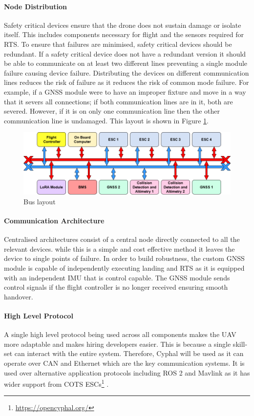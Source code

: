 \paragraph{Node Distribution}
Safety critical devices ensure that the drone does not sustain damage or isolate itself. This includes components necessary for flight and the sensors required for \gls{RTS}. To ensure that failures are minimised, safety critical devices should be redundant. If a safety critical device does not have a redundant version it should be able to communicate on at least two different lines preventing a single module failure causing device failure. Distributing the devices on different communication lines reduces the risk of failure as it reduces the risk of common mode failure. For example, if a \gls{GNSS} module were to have an improper fixture and move in a way that it severs all connections; if both communication lines are in it, both are severed. However, if it is on only one communication line then the other communication line is undamaged. This layout is shown in Figure \ref{fig:CAN_bus}. 
 \begin{figure}[h!]
 \centering
  \includegraphics[width=1\textwidth]{figs/Thomas/Intra Communication/CAN bus.png}
 \caption{Bus layout}
 \label{fig:CAN_bus}
 \end{figure}
\paragraph{Communication Architecture}
Centralised architectures consist of a central node directly connected to all the relevant devices. while this is a simple and cost effective method it leaves the device to single points of failure. In order to build robustness, the custom \gls{GNSS} module is capable of independently executing landing and \gls{RTS} as it is equipped with an independent \gls{IMU} that is control capable. The \gls{GNSS} module sends control signals if the flight controller is no longer received ensuring smooth handover. 
\paragraph{High Level Protocol}
A single high level protocol being used across all components makes the \gls{UAV} more adaptable and makes hiring developers easier. This is because a single skill-set can interact with the entire system. Therefore, Cyphal will be used as it can operate over \gls{CAN} and Ethernet which are the key communication systems. It is used over alternative application protocols including ROS 2 and Mavlink as it has wider support from \gls{COTS} \gls{ESC}s\footnote{\url{https://opencyphal.org/}} . 
